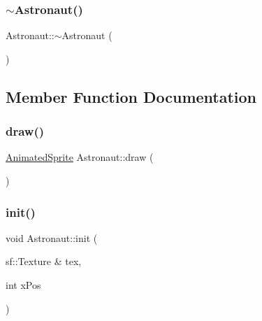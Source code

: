 \hypertarget{class_astronaut_af31f9de205719a042df5f0a1879ee064}{}\label{class_astronaut_af31f9de205719a042df5f0a1879ee064} 
\subsubsection{\texorpdfstring{$\sim$\+Astronaut()}{~Astronaut()}}
{\footnotesize\ttfamily Astronaut\+::$\sim$\+Astronaut (\begin{DoxyParamCaption}{ }\end{DoxyParamCaption})}



\subsection{Member Function Documentation}
\hypertarget{class_astronaut_a0dca06c39c27c2f451de64bbc1785d0a}{}\label{class_astronaut_a0dca06c39c27c2f451de64bbc1785d0a} 
\subsubsection{\texorpdfstring{draw()}{draw()}}
{\footnotesize\ttfamily \hyperlink{class_animated_sprite}{Animated\+Sprite} Astronaut\+::draw (\begin{DoxyParamCaption}{ }\end{DoxyParamCaption})}

\hypertarget{class_astronaut_a2eb1049d06ec7546b5320648d573abbc}{}\label{class_astronaut_a2eb1049d06ec7546b5320648d573abbc} 
\subsubsection{\texorpdfstring{init()}{init()}}
{\footnotesize\ttfamily void Astronaut\+::init (\begin{DoxyParamCaption}\item[{sf\+::\+Texture \&}]{tex,  }\item[{int}]{x\+Pos }\end{DoxyParamCaption})}

\hypertarget{class_astronaut_a2dff61a54b10d5fb38f68d2f63668387}{}\label{class_astronaut_a2dff61a54b10d5fb38f68d2f63668387} 
